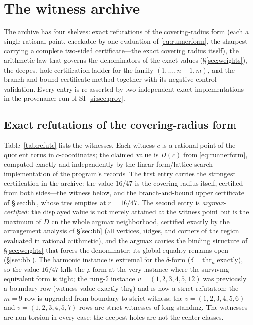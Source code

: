 
\section{The witness archive}\label{sec:witness}

The archive has four shelves: exact refutations of the covering-radius
form (each a single rational point, checkable by one evaluation of
\eqref{eq:runnerform}, the sharpest carrying a complete two-sided
certificate---the exact covering radius itself), the arithmetic law
that governs the denominators of the
exact values (\S\ref{sec:weights}), the deepest-hole certification
ladder for the family $(1,\dots,n{-}1,m)$, and the branch-and-bound
certificate method together with its negative-control validation. Every
entry is re-asserted by two independent exact implementations in the
provenance run of SI~\ref{si:sec:prov}.

\subsection{Exact refutations of the covering-radius form}

Table~\ref{tab:refute} lists the witnesses. Each witness $c$ is a
rational point of the quotient torus in $c$-coordinates; the claimed
value is $D(c)$ from \eqref{eq:runnerform}, computed exactly and
independently by the linear-form/lattice-search implementation of the
program's records. The first entry carries the strongest certification
in the archive: the value $16/47$ is the covering radius itself,
certified from both sides---the witness below, and the branch-and-bound
upper certificate of \S\ref{sec:bb}, whose tree empties at $r=16/47$.
The second entry is \emph{argmax-certified}: the displayed value is
not merely attained at the witness point but is the maximum of $D$ on
the whole argmax neighborhood, certified exactly by the arrangement
analysis of \S\ref{sec:bb} (all vertices, ridges, and corners of the
region evaluated in rational arithmetic), and the argmax carries the
binding structure of \S\ref{sec:weights} that forces the denominator;
its global equality remains open (\S\ref{sec:bb}).
The harmonic instance is extremal for the $\delta$-form
($\delta=\mathrm{thr}_n$ exactly), so the value $16/47$ kills the
$\rho$-form at the very instance where the surviving equivalent form is
tight; the rung-2 instance $v=(1,2,3,4,5,12)$ was previously a
boundary row (witness value exactly $\mathrm{thr}_6$) and is now a
strict refutation; the $m=9$ row is upgraded from boundary to strict
witness; the $v=(1,2,3,4,5,6)$ and $v=(1,2,3,4,5,7)$ rows are strict
witnesses of long standing. The witnesses are non-torsion in every
case: the deepest holes are not the center classes.

